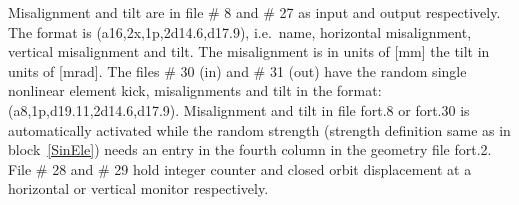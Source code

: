 \documentclass[a4paper,11pt]{report}
\begin{document}
Misalignment and tilt are in file \# 8 and \# 27 as input and output
respectively. The format is (a16,2x,1p,2d14.6,d17.9), i.e.\ name,
horizontal misalignment, vertical misalignment and tilt. The
misalignment is in units of [mm] the tilt in units of [mrad]. The
files \# 30 (in) and \# 31 (out) have the random single nonlinear
element kick, misalignments and tilt in the format:
(a8,1p,d19.11,2d14.6,d17.9). Misalignment and tilt in file fort.8 or
fort.30 is automatically activated while the random strength (strength
definition same as in block~\ref{SinEle}) needs an entry in the fourth
column in the geometry file fort.2. File \# 28 and \# 29 hold integer
counter and closed orbit displacement at a horizontal or vertical
monitor respectively. 

 \setcounter{dst}{0}
\end{document}
